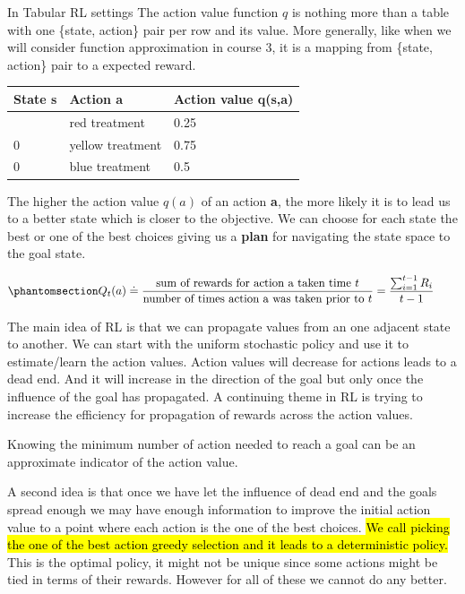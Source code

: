 \documentclass[
  letterpaper,
  DIV=11,
  numbers=noendperiod,
  oneside]{scrartcl}
\theoremstyle{definition}
\theoremstyle{remark}
\begin{document}
In Tabular RL settings The action value function \(q\) is nothing more
than a table with one \{state, action\} pair per row and its value. More
generally, like when we will consider function approximation in course
3, it is a mapping from \{state, action\} pair to a expected reward.

\begin{longtable}[]{@{}lll@{}}
\toprule\noalign{}
State s & Action a & Action value q(s,a) \\
\midrule\noalign{}
\endhead
\bottomrule\noalign{}
\endlastfoot
0 & red treatment & 0.25 \\
0 & yellow treatment & 0.75 \\
0 & blue treatment & 0.5 \\
\end{longtable}

The higher the action value \(q(a)\) of an action \textbf{a}, the more
likely it is to lead us to a better state which is closer to the
objective. We can choose for each state the best or one of the best
choices giving us a \textbf{plan} for navigating the state space to the
goal state.

\begin{equation}\phantomsection\label{eq-sample-average}{
Q_t(a) \doteq \frac{\text{sum of rewards for action a taken time } t}{\text{number of times action a was taken prior to } t} = \frac{\sum_{i=1}^{t-1} R_i}{t-1} \qquad
}\end{equation}

The main idea of RL is that we can propagate values from an one adjacent
state to another. We can start with the uniform stochastic policy and
use it to estimate/learn the action values. Action values will decrease
for actions leads to a dead end. And it will increase in the direction
of the goal but only once the influence of the goal has propagated. A
continuing theme in RL is trying to increase the efficiency for
propagation of rewards across the action values.

Knowing the minimum number of action needed to reach a goal can be an
approximate indicator of the action value.

A second idea is that once we have let the influence of dead end and the
goals spread enough we may have enough information to improve the
initial action value to a point where each action is the one of the best
choices. \hl{We call picking the one of the best action greedy selection
and it leads to a deterministic policy.} This is the optimal policy, it
might not be unique since some actions might be tied in terms of their
rewards. However for all of these we cannot do any better.
\end{document}
